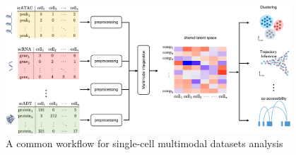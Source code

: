 \begin{figure}[!ht]
	\centering
	\includegraphics[width=0.95\textwidth]{workflow_multimodal/fig}
	\vspace{0.1cm}
	\caption[A common computational multimodal analysis workflow.]{A common workflow for single-cell multimodal datasets analysis}
	\label{fig:workflow_multimodal}
\end{figure}

